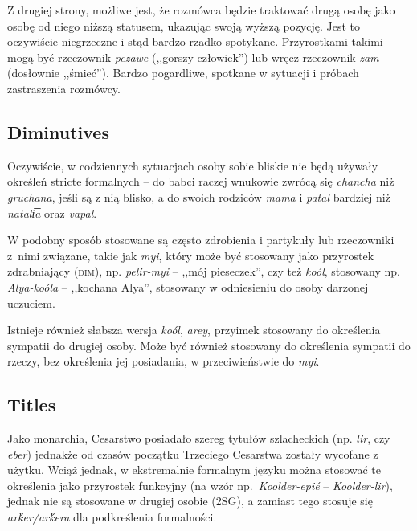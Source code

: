 
\skipline

Z drugiej strony, możliwe jest, że rozmówca będzie traktować drugą osobę jako
osobę od niego niższą statusem, ukazując swoją wyższą pozycję. Jest to
oczywiście niegrzeczne i stąd bardzo rzadko spotykane. Przyrostkami takimi mogą
być rzeczownik \emph{pezawe} (,,gorszy człowiek'') lub wręcz rzeczownik
\emph{zam} (dosłownie ,,śmieć''). Bardzo pogardliwe, spotkane w sytuacji i
próbach zastraszenia rozmówcy.

\subsection{Diminutives}

Oczywiście, w codziennych sytuacjach osoby sobie bliskie nie będą używały
określeń stricte formalnych -- do babci raczej wnukowie zwrócą się
\emph{chancha} niż \emph{gruchana}, jeśli są z nią blisko, a do swoich rodziców
\emph{mama} i \emph{patal} bardziej niż \emph{natali͞a} oraz \emph{vapal}.

W podobny sposób stosowane są często zdrobienia i partykuły lub rzeczowniki
z~nimi związane, takie jak \emph{myi}, który może być stosowany jako przyrostek
zdrabniający (\textsc{dim}), np. \emph{pelir-myi} -- ,,mój pieseczek'', czy też
\emph{koól}, stosowany np. \emph{Alya-koóla} -- ,,kochana Alya'', stosowany w
odniesieniu do osoby darzonej uczuciem.

Istnieje również słabsza wersja \emph{koól}, \emph{arey}, przyimek stosowany do
określenia sympatii do drugiej osoby. Może być również stosowany do określenia
sympatii do rzeczy, bez określenia jej posiadania, w przeciwieństwie do
\emph{myi}.

\subsection{Titles}

Jako monarchia, Cesarstwo posiadało szereg tytułów szlacheckich (np. \emph{lir},
czy \emph{eber}) jednakże od czasów początku Trzeciego Cesarstwa zostały
wycofane z użytku. Wciąż jednak, w ekstremalnie formalnym języku można stosować
te określenia jako przyrostek funkcyjny (na wzór np.~\emph{Koolder-epié} --
\emph{Koolder-lir}), jednak nie są stosowane w drugiej osobie (\textsc{2SG}), a
zamiast tego stosuje się \emph{arḱer/arḱera} dla podkreślenia formalności.

